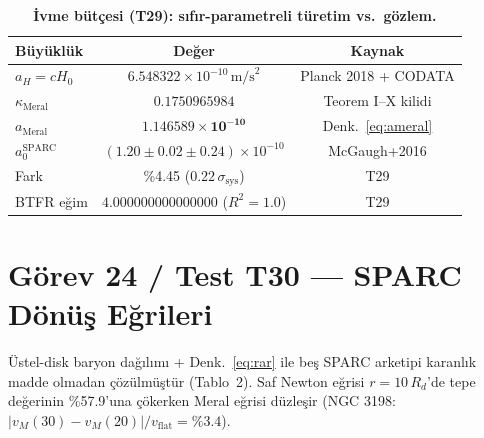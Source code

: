 \documentclass[12pt,a4paper]{article}
\begin{document}
\begin{table}[!htbp]
\centering\footnotesize
\setlength{\tabcolsep}{3pt}
\caption{\textbf{İvme bütçesi (T29): sıfır-parametreli türetim vs.\ gözlem.}}
\label{tab:acc}
\vspace{0.1cm}
\begin{tabular}{@{}l|c|c@{}}
\toprule
Büyüklük & Değer & Kaynak \\
\midrule
$a_H = cH_0$ & $6.548322\times 10^{-10}\,\mathrm{m/s}^2$ & Planck 2018 + CODATA \\
$\kappa_{\mathrm{Meral}}$ & $0.1750965984$ & Teorem I--X kilidi \\
$a_{\mathrm{Meral}}$ & $\mathbf{1.146589\times 10^{-10}}$ & Denk.~\ref{eq:ameral} \\
$a_0^{\mathrm{SPARC}}$ & $(1.20\pm 0.02\pm 0.24)\times 10^{-10}$ & McGaugh+2016 \\
Fark & \%4.45 ($0.22\,\sigma_{\mathrm{sys}}$) & T29 \\
BTFR eğim & $4.000000000000000$ ($R^2=1.0$) & T29 \\
\bottomrule
\end{tabular}
\end{table}

\section{Görev 24 / Test T30 --- SPARC Dönüş Eğrileri}

Üstel-disk baryon dağılımı + Denk.~\ref{eq:rar} ile beş SPARC arketipi karanlık
madde olmadan çözülmüştür (Tablo~2). Saf Newton eğrisi $r = 10\,R_d$'de tepe
değerinin \%57.9'una çökerken Meral eğrisi düzleşir
(NGC 3198: $|v_M(30)-v_M(20)|/v_{\mathrm{flat}} = \%3.4$).
\end{document}
